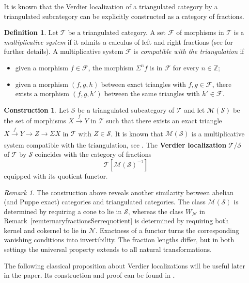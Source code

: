 \documentclass[11pt,reqno,a4paper]{amsart}
\theoremstyle{definition}
\newtheorem{definition}[theorem]{Definition}
\newtheorem{construction}[theorem]{Construction}
\theoremstyle{remark}
\newtheorem{remark}[theorem]{Remark}
\def\dfn#1{{\itshape #1}}
\newcommand{\N}{\mathcal{N}}
\newcommand{\T}{\mathcal{T}}
\renewcommand{\S}{\mathcal{S}}
\newcommand{\F}{\mathcal{F}}
\newcommand{\0}{\mathbf{0}}
\renewcommand{\1}{\mathbf{1}}
\newcommand{\aar}[2][]{\xrightarrow[#1]{#2}}
\begin{document}
It is known that the Verdier localization of a triangulated category by a triangulated subcategory can be explicitly constructed as a category of fractions.

\begin{definition}
    Let $\T$ be a triangulated category. A set $\mathcal{F}$ of morphisms in $\T$ is a \dfn{multiplicative system} if it admits a calculus of left and right fractions (see \cite{GZ,StacksLoc} for further details). A multiplicative system $\mathcal{F}$ is \dfn{compatible with the triangulation} if
    \begin{itemize}
        \item [(1)] given a morphism $f \in \mathcal{F}$, the morphism $\Sigma^n f$ is in $\F$ for every $n\in \mathbb{Z}$;
        \item [(2)] given a morphism $(f,g,h)$ between exact triangles with $f,g\in \F$, there exists a morphism $(f,g,h')$ between the same triangles with $h'\in \F$.
    \end{itemize}
\end{definition}

\begin{construction}
    Let $\S$ be a triangulated subcategory of $\T$ and let $\mathcal{M}(\S)$ be the set of  morphisms $X \aar{f} Y$ in $\T$ such that there exists an exact triangle $X \aar{f} Y \aar{} Z \aar{} \Sigma X$ in $\T$ with $Z \in \S$. It is known that $\mathcal{M}(\S)$  is a multiplicative system compatible with the triangulation, see \cite{StacksTri}. The \textbf{Verdier localization} $\T/\S$ of $\T$ by $\S$ coincides with the category of fractions
$$\T [\mathcal{M}(\S)^{-1}]$$
equipped with its quotient functor.
\end{construction}

\begin{remark}
    The construction above reveals another similarity between abelian (and Puppe exact) categories and triangulated categories. The class $\mathcal M(\S)$ is determined by requiring a cone to lie in $\S$, whereas the class $W_{\N}$ in Remark~\ref{remternaryfractionsSerrequotient} is determined by requiring both kernel and cokernel to lie in $\N$. Exactness of a functor turns the corresponding vanishing conditions into invertibility. The fraction lengths differ, but in both settings the universal property extends to all natural transformations.
\end{remark}

The following classical proposition about Verdier localizations will be useful later in the paper. Its construction and proof can be found in \cite{Verdier,StacksTri,StacksTriQuotientKernel}.
\end{document}
